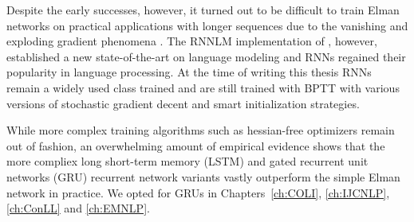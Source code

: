Despite the early successes, however, it turned out to be difficult to train
Elman networks on practical applications with longer sequences
due to the vanishing and exploding gradient phenomena \citep{bengio1994learning}.
The RNNLM implementation of \cite{mikolov2010recurrent}, however,
established a new state-of-the-art on language modeling and RNNs regained their popularity
in language processing.  At the time of writing this thesis RNNs remain a widely used class
trained and are still trained with BPTT with various versions of stochastic gradient decent and smart initialization
strategies. 

While more complex training algorithms such as hessian-free optimizers
\citep{martens2011learning} remain out of fashion,
an overwhelming amount of empirical evidence
shows that the more compliex long short-term
memory (LSTM) \citep{hochreiter1997long,gers1999learning}
and gated recurrent unit networks (GRU) \citep{Cho2014}  recurrent network variants
vastly outperform the simple Elman network in practice. We opted for GRUs in
Chapters~\ref{ch:COLI}, \ref{ch:IJCNLP}, \ref{ch:ConLL} and \ref{ch:EMNLP}.








